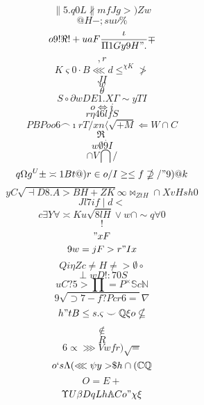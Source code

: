 \documentclass[12pt]{article}
\begin{document}
        \begin{minipage}[t][0pt]{\linewidth}

        \[\parallel 5 . q 0 L\nparallel m f J g > ) Z w\]
\[@H-;su\nu\%\]
\[o9!\Re ! + u a F\frac{\iota}{\Pi 1 G y 9 H " .}\mp\]
\[,r\]
\[K\varsigma 0\cdot B\lll d\leq^{\chi K}\ngtr\]
\[JI\]
\[w\]
\[\theta\]
\[S\circ\partial w D E 1 . {X}\Gamma\sim y T I\]
\[o\iff i\]
\[r\eta 4 6 l f S\]
\[PBPoo6\frown {\imath r T / x n}\langle\sqrt{+M}\Leftarrow W\cap C\]
\[\Re_{.}\]
\[w\emptyset 9 I\]
\[\cap {V}\bigcap /\]
\[q\Omega g^{U}\pm\asymp 1 B t @ ) r\in o / I\geq\leq f\nsupseteq / " 9 ) @ k\]
\[yC\sqrt{\dashv D 8 . A > B H + Z K}\infty\bowtie_{ZtH}\cap X v H s h 0\]
\[Jl7if\mid d <\]
\[c\exists Y\forall\asymp K u\sqrt{8lH}\lor w\cap\sim q\forall 0\]
\[!\]
\["xF\]
\[9w=jF> r " I x\]
\[Qi\eta Z c\neq H\neq >\emptyset\circ\]
\[\perp w D ! : 7 0 S\]
\[uC?5>\prod = P^{\times}\mathbb{S} c\mathbb{N}\]
\[9\sqrt{\supset 7 - f ? P c r 6 =}\nabla\]
\[h"tB\leq s .\varsigma\smile\mathbb{Q}\xi o\nsubseteq\]
\[\notin\]
\[R\]
\[6\propto\ggg V w f r )\sqrt{=}\]
\[o`s\Lambda (\lll\psi {y>}\$ h\cap (\mathbb{C}\mathbb{Q}\]
\[O=E+\]
\[\Upsilon U\beta D q L h\mathbb{A} C o "\chi\xi
        \]
\end{minipage}
\end{document}
